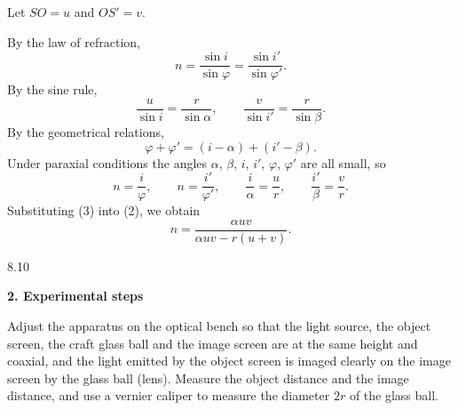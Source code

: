 Let $SO=u$ and $OS'=v$.

By the law of refraction,
\begin{equation}
n=\frac{\sin i}{\sin\varphi}=\frac{\sin i'}{\sin\varphi'}. \tag{1}
\end{equation}
By the sine rule,
\[
\frac{u}{\sin i}=\frac{r}{\sin\alpha},\qquad
\frac{v}{\sin i'}=\frac{r}{\sin\beta}.
\]
By the geometrical relations,
\begin{equation}
\varphi+\varphi'=(i-\alpha)+(i'-\beta). \tag{2}
\end{equation}
Under paraxial conditions the angles $\alpha$, $\beta$, $i$, $i'$, $\varphi$, $\varphi'$ are all small, so
\begin{equation}
n=\frac{i}{\varphi},\qquad n=\frac{i'}{\varphi'},\qquad
\frac{i}{\alpha}=\frac{u}{r},\qquad \frac{i'}{\beta}=\frac{v}{r}. \tag{3}
\end{equation}
Substituting (3) into (2), we obtain
\begin{equation}
n=\frac{\alpha uv}{\alpha uv-r(u+v)}. \tag{4}
\end{equation}

\begin{figbox}{8.10}
\end{figbox}

\textbf{2. Experimental steps}

Adjust the apparatus on the optical bench so that the light source, the object screen, the craft glass ball and the image screen are at the same height and coaxial, and the light emitted by the object screen is imaged clearly on the image screen by the glass ball (lens). Measure the object distance and the image distance, and use a vernier caliper to measure the diameter $2r$ of the glass ball.

